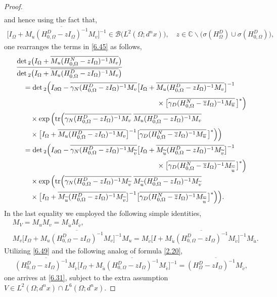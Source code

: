 \documentclass[reqno,10pt, centertags]{amsart}
\newcommand{\bbC}{{\mathbb{C}}}
\newcommand{\cB}{{\mathcal B}}
\newcommand{\no}{\nonumber}
\newcommand{\lb}{\label}
\newcommand{\ol}{\overline}
\newcommand{\wti}{\widetilde}
\newcommand{\ga}{\gamma}
\newcommand{\si}{\sigma}
\newcommand{\Om}{\Omega}
\newcommand{\dOm}{{\partial\Omega}}
\newcommand{\tr}{\text{\rm{tr}}}
\numberwithin{equation}{section}
\theoremstyle{definition}
\begin{document}
\begin{proof}
\begin{align}
\end{align}
and hence using the fact that,
\begin{align}
\big[I_{\Om}+\ol{M_u(H_{0,\Om}^D-zI_{\Om})^{-1}M_v}\big]^{-1} \in
\cB\big(L^2(\Om;d^nx)\big), \quad z\in\bbC\backslash
\big(\si(H_{\Om}^D)\cup\si(H_{0,\Om}^D)\big),
\end{align}
one rearranges the terms in \eqref{6.45} as follows,
\begin{align}
&\frac{\det{}_2\big(I_{\Om}+\ol{M_u(H_{0,\Om}^N-zI_{\Om})^{-1}M_v}\big)}
{\det{}_2\big(I_{\Om}+\ol{M_u(H_{0,\Om}^D-zI_{\Om})^{-1}M_v}\big)}  \no
\\
&\quad = \det{}_2\Big(I_{\dOm} - \ol{\ga_N (H_{0,\Om}^D-zI_{\Om})^{-1}M_v}
\big[I_{\Om}+\ol{M_u(H_{0,\Om}^D-zI_{\Om})^{-1}M_v}\big]^{-1}  \no
\\
& \hspace*{7cm} \times \big[\ol{\ga_D
(H_{0,\Om}^N-\ol{z}I_{\Om})^{-1}M_{\ol{u}}}\,\big]^*\Big)  \no
\\
&\quad\quad \times \exp\Big(\tr\Big(\ol{\ga_N
(H_{0,\Om}^D-zI_{\Om})^{-1} M_v} \;
\ol{M_u(H_{0,\Om}^D-zI_{\Om})^{-1} M_v}  \no
\\
&\quad\quad \times \big[I_{\Om}+ \ol{M_u(H_{0,\Om}^D-zI_{\Om})^{-1}
M_v}\big]^{-1} \big[\ol{\ga_D
(H_{0,\Om}^N-\ol{z}I_{\Om})^{-1}M_{\ol{u}}}\,\big]^*\Big)\Big)  \no
\\
&\quad = \det{}_2\Big(I_{\dOm} - \ol{\ga_N(H_{0,\Om}^D
-zI_{\Om})^{-1}M_{\wti v}}
\big[I_{\Om}+\ol{M_{\wti u}(H_{0,\Om}^D-zI_{\Om})^{-1}M_{\wti
v}}\big]^{-1}   \no
\\
& \hspace*{7cm} \times \big[\ol{\ga_D
(H_{0,\Om}^N-\ol{z}I_{\Om})^{-1}M_{\ol{\wti u}}}\,\big]^*\Big)  \no
\\
&\quad\quad \times
\exp\Big(\tr\Big(\ol{\ga_N(H_{0,\Om}^D-zI_{\Om})^{-1}M_{\wti v}} \;
\ol{M_{\wti u}(H_{0,\Om}^D-zI_{\Om})^{-1}M_{\wti v}}  \lb{6.49}
\\
&\quad\quad \times \big[I_{\Om}+\ol{M_{\wti
u}(H_{0,\Om}^D-zI_{\Om})^{-1}M_{\wti v}}\big]^{-1} \big[\ol{\ga_D
(H_{0,\Om}^N-\ol{z}I_{\Om})^{-1}M_{\ol{\wti u}}}\,\big]^*\Big)\Big).
\no
\end{align}
In the last equality we employed the following simple identities,
\begin{align}
& M_V = M_u M_v = M_{\wti u}  M_{\wti v},  \\
& M_v\big[I_{\Om}+\ol{M_u(H_{0,\Om}^D-zI_{\Om})^{-1}M_v}\big]^{-1}M_u
= M_{\wti v}
\big[I+\ol{M_{\wti u}(H_{0,\Om}^D-zI_{\Om})^{-1}M_{\wti v}}\big]^{-1}
M_{\wti u}.
\end{align}
Utilizing \eqref{6.49} and the following analog of formula \eqref{2.20},
\begin{align}
\ol{(H_{0,\Om}^D-zI_{\Om})^{-1}M_{\wti v}} \big[I_{\Om}+\ol{M_{\wti
u}(H_{0,\Om}^D-zI_{\Om})^{-1}M_{\wti v}}\big]^{-1} =
\ol{(H_{\Om}^D-zI_{\Om})^{-1}M_{\wti v}},
\end{align}
one arrives at \eqref{6.31}, subject to the extra assumption $V\in
L^2(\Om;d^n x)\cap L^6(\Om;d^n x)$.


\end{proof}
\end{document}
